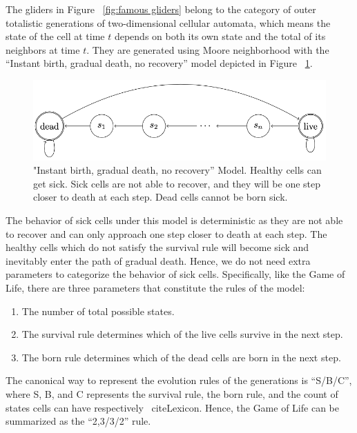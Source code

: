 \documentclass[12pt]{article}
\numberwithin{figure}{section} %
\begin{document}
The gliders in Figure ~\ref{fig:famous gliders} belong to the category of outer totalistic generations of two-dimensional cellular automata, which means the state of the cell at time $t$ depends on both its own state and the total of its neighbors at time $t$. They are generated using Moore neighborhood with the “Instant birth, gradual death, no recovery” model depicted in Figure ~\ref{fig:IGN model}. 

\begin{figure}[H]
\centering
\includegraphics[width=\linewidth]{Section1/9}
\caption["Instant birth, gradual death, no recovery” Model]{"Instant birth, gradual death, no recovery” Model. Healthy cells can get sick. Sick cells are not able to recover, and they will be one step closer to death at each step. Dead cells cannot be born sick.}
\label{fig:IGN model}
\vspace{-1.5em}
\end{figure}

The behavior of sick cells under this model is deterministic as they are not able to recover and can only approach one step closer to death at each step. The healthy cells which do not satisfy the survival rule will become sick and inevitably enter the path of gradual death. Hence, we do not need extra parameters to categorize the behavior of sick cells. Specifically, like the Game of Life, there are three parameters that constitute the rules of the model: 
\begin{enumerate}[topsep=0pt,itemsep=-1ex,partopsep=1ex,parsep=1ex]
\item The number of total possible states. 
\item The survival rule determines which of the live cells survive in the next step. 
\item The born rule determines which of the dead cells are born in the next step. 
\end{enumerate}
The canonical way to represent the evolution rules of the generations is “S/B/C”, where S, B, and C represents the survival rule, the born rule, and the count of states cells can have respectively ~cite{Lexicon}. Hence, the Game of Life can be summarized as the “2,3/3/2” rule.
\end{document}
